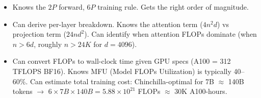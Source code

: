\begin{interviewq}

\goodgreat
\begin{itemize}
    \item {} Knows the $2P$ forward, $6P$ training rule. Gets the right order of magnitude.
    \item {} Can derive per-layer breakdown. Knows the attention term ($4n^2d$) vs projection term ($24nd^2$). Can identify when attention FLOPs dominate (when $n > 6d$, roughly $n > 24K$ for $d=4096$).
    \item {} Can convert FLOPs to wall-clock time given GPU specs (A100 = 312 TFLOPS BF16). Knows MFU (Model FLOPs Utilization) is typically 40--60\%. Can estimate total training cost: Chinchilla-optimal for 7B $\approx$ 140B tokens $\rightarrow$ $6 \times 7B \times 140B = 5.88 \times 10^{21}$ FLOPs $\approx$ 30K A100-hours.
\end{itemize}

\end{interviewq}

